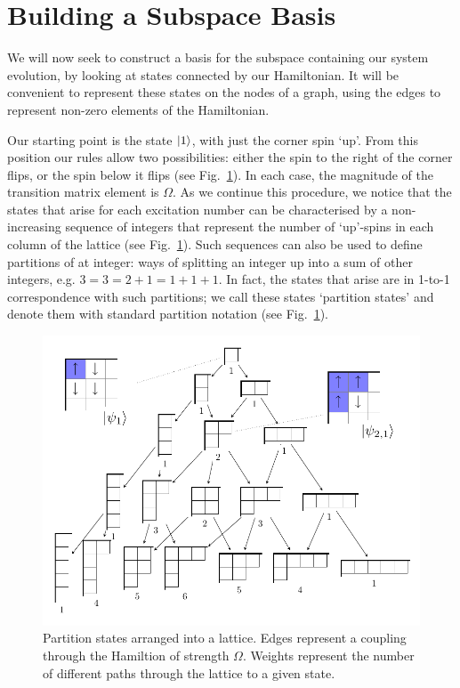 \section{Building a Subspace Basis} 

We will now seek to construct a basis for the subspace containing our system evolution, by looking at states connected by our Hamiltonian. It will be convenient to represent these states on the nodes of a graph, using the edges to represent non-zero elements of the Hamiltonian.

Our starting point is the state $\left\vert1\right\rangle$, with just the corner spin `up'. From this position our rules allow two possibilities: either the spin to the right of the corner flips, or the spin below it flips (see Fig.~\ref{partition_states}). In each case, the magnitude of the transition matrix element is $\Omega$. As we continue this procedure, we notice that the states that arise for each excitation number can be characterised by a non-increasing sequence of integers that represent the number of `up'-spins in each column of the lattice (see Fig.~\ref{partition_states}). Such sequences can also be used to define partitions of at integer: ways of splitting an integer up into a sum of other integers, e.g. $3=3=2+1=1+1+1$. In fact, the states that arise are in 1-to-1 correspondence with such partitions; we call these states `partition states' and denote them with standard partition notation (see Fig.~\ref{partition_states}).
\begin{figure}
  \begin{center}
    \includegraphics[scale=0.8]{assets/youngs_lattice_with_spins}
  \end{center}
  \caption{Partition states arranged into a lattice. Edges represent a coupling
    through the Hamiltion of strength $\Omega$. Weights represent the
  number of different paths through the lattice to a given state.}
  \label{partition_states}
\end{figure}
